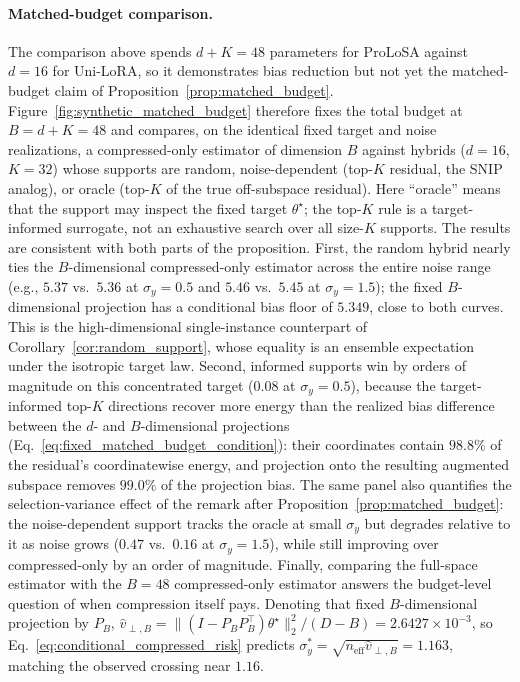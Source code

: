\paragraph{Matched-budget comparison.}
The comparison above spends $d+K=48$ parameters for ProLoSA against $d=16$ for Uni-LoRA, so it demonstrates bias reduction but not yet the matched-budget claim of Proposition~\ref{prop:matched_budget}.
Figure~\ref{fig:synthetic_matched_budget} therefore fixes the total budget at $B=d+K=48$ and compares, on the identical fixed target and noise realizations, a compressed-only estimator of dimension $B$ against hybrids ($d=16$, $K=32$) whose supports are random, noise-dependent (top-$K$ residual, the SNIP analog), or oracle (top-$K$ of the true off-subspace residual).
Here ``oracle'' means that the support may inspect the fixed target $\theta^\star$; the top-$K$ rule is a target-informed surrogate, not an exhaustive search over all size-$K$ supports.
The results are consistent with both parts of the proposition.
First, the random hybrid nearly ties the $B$-dimensional compressed-only estimator across the entire noise range (e.g., $5.37$ vs.\ $5.36$ at $\sigma_y=0.5$ and $5.46$ vs.\ $5.45$ at $\sigma_y=1.5$); the fixed $B$-dimensional projection has a conditional bias floor of $5.349$, close to both curves.
This is the high-dimensional single-instance counterpart of Corollary~\ref{cor:random_support}, whose equality is an ensemble expectation under the isotropic target law.
Second, informed supports win by orders of magnitude on this concentrated target ($0.08$ at $\sigma_y=0.5$), because the target-informed top-$K$ directions recover more energy than the realized bias difference between the $d$- and $B$-dimensional projections (Eq.~\eqref{eq:fixed_matched_budget_condition}): their coordinates contain $98.8\%$ of the residual's coordinatewise energy, and projection onto the resulting augmented subspace removes $99.0\%$ of the projection bias.
The same panel also quantifies the selection-variance effect of the remark after Proposition~\ref{prop:matched_budget}: the noise-dependent support tracks the oracle at small $\sigma_y$ but degrades relative to it as noise grows ($0.47$ vs.\ $0.16$ at $\sigma_y=1.5$), while still improving over compressed-only by an order of magnitude.
Finally, comparing the full-space estimator with the $B=48$ compressed-only estimator answers the budget-level question of when compression itself pays.
Denoting that fixed $B$-dimensional projection by $P_B$,
$\hat v_{\perp,B}=\|(I-P_BP_B^\top)\theta^\star\|_2^2/(D-B)=2.6427\times10^{-3}$, so Eq.~\eqref{eq:conditional_compressed_risk} predicts
$\sigma_y^\ast=\sqrt{n_{\mathrm{eff}}\hat v_{\perp,B}}=1.163$, matching the observed crossing near $1.16$.

